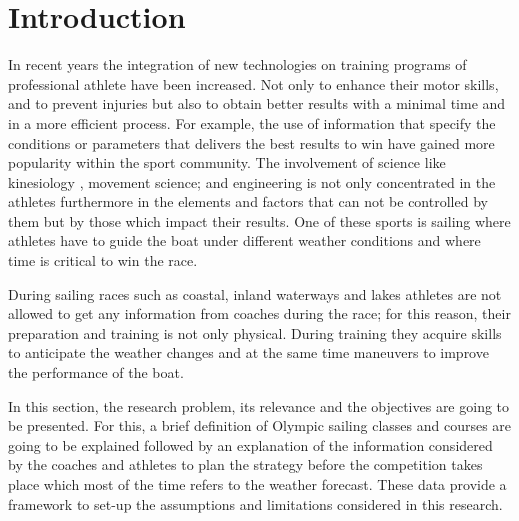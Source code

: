 \chapter{Introduction}


In recent years the integration of new technologies on training programs of professional athlete have been increased. Not only to enhance their motor skills, and to prevent injuries but also to obtain better results with a minimal time and in a more efficient process. For example, the use of information that specify the conditions or parameters that delivers the best results to win have gained more popularity within the sport community. The involvement of science like kinesiology \cite{sjogaard2015science}, movement science; and engineering is not only concentrated in the athletes furthermore in the elements and factors that can not be controlled by them but by those which impact their results. One of these sports is sailing where athletes have to guide the boat under different weather conditions and where time is critical to win the race.\par
During sailing races such as coastal, inland waterways and lakes athletes are not allowed to get any information from coaches during the race; for this reason, their preparation and training is not only physical. During training they acquire skills to anticipate the weather changes and at the same time maneuvers to improve the performance of the boat. \par
In this section, the research problem, its relevance and the objectives are going to be presented. For this, a brief definition of Olympic sailing classes and courses are going to be explained followed by an explanation of the information considered by the coaches and athletes to plan the strategy before the competition takes place which most of the time refers to the weather forecast. These data provide a framework to set-up the assumptions and limitations considered in this research. \par 
